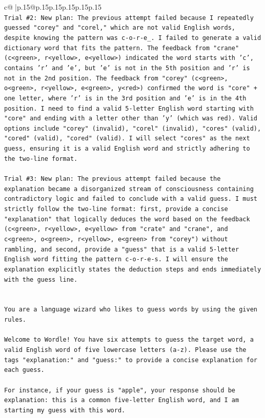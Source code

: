 \documentclass{article}
\begin{document}
{\begin{supertabular}{c@{$\;$}|p{.15\linewidth}@{}p{.15\linewidth}p{.15\linewidth}p{.15\linewidth}p{.15\linewidth}p{.15\linewidth}}
{{{\\ 
\texttt{Trial \#2: New plan: The previous attempt failed because I repeatedly guessed "corey" and "corel," which are not valid English words, despite knowing the pattern was c{-}o{-}r{-}e\_. I failed to generate a valid dictionary word that fits the pattern. The feedback from "crane" (c<green>, r<yellow>, e<yellow>) indicated the word starts with 'c', contains 'r' and 'e', but 'e' is not in the 5th position and 'r' is not in the 2nd position. The feedback from "corey" (c<green>, o<green>, r<yellow>, e<green>, y<red>) confirmed the word is "core" + one letter, where 'r' is in the 3rd position and 'e' is in the 4th position. I need to find a valid 5{-}letter English word starting with "core" and ending with a letter other than 'y' (which was red). Valid options include "corey" (invalid), "corel" (invalid), "cores" (valid), "cored" (valid), "cored" (valid). I will select "cores" as the next guess, ensuring it is a valid English word and strictly adhering to the two{-}line format.} \\
\\ 
\texttt{Trial \#3: New plan: The previous attempt failed because the explanation became a disorganized stream of consciousness containing contradictory logic and failed to conclude with a valid guess. I must strictly follow the two{-}line format: first, provide a concise "explanation" that logically deduces the word based on the feedback (c<green>, r<yellow>, e<yellow> from "crate" and "crane", and c<green>, o<green>, r<yellow>, e<green> from "corey") without rambling, and second, provide a "guess" that is a valid 5{-}letter English word fitting the pattern c{-}o{-}r{-}e{-}s. I will ensure the explanation explicitly states the deduction steps and ends immediately with the guess line.} \\
\\ 
\\ 
\texttt{You are a language wizard who likes to guess words by using the given rules.} \\
\\ 
\texttt{Welcome to Wordle! You have six attempts to guess the target word, a valid English word of five lowercase letters (a{-}z). Please use the tags "explanation:" and "guess:" to provide a concise explanation for each guess.} \\
\\ 
\texttt{For instance, if your guess is "apple", your response should be} \\
\texttt{explanation: this is a common five{-}letter English word, and I am starting my guess with this word.} \\
}}}
\end{supertabular}}
\end{document}
